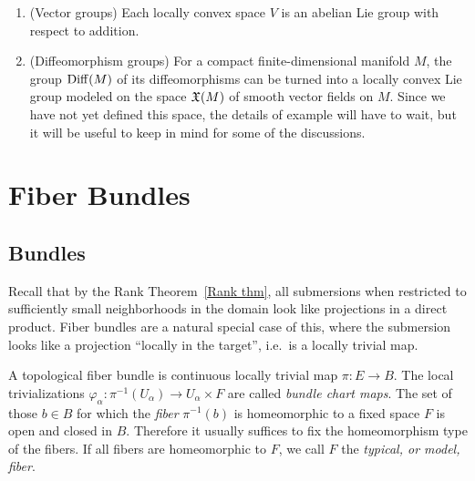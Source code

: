 \begin{example}
    \begin{enumerate}[label=(\alph*)]
        \item (Vector groups) Each locally convex space $V$ is an abelian Lie group with respect to addition.
        \item (Diffeomorphism groups) For a compact finite-dimensional manifold $M$, the group $\operatorname{Diff}(M)$ of its diffeomorphisms can be turned into a locally convex Lie group modeled on the space $\mathfrak{X}(M)$ of smooth vector fields on $M$. Since we have not yet defined this space, the details of example will have to wait, but it will be useful to keep in mind for some of the discussions.
    \end{enumerate}
\end{example}











\newpage
\section{Fiber Bundles}\label{sec: Fiber bundles}

\subsection{Bundles}

Recall that by the Rank Theorem~\ref{Rank thm}, all submersions when restricted to sufficiently small neighborhoods in the domain look like projections in a direct product. Fiber bundles are a natural special case of this, where the submersion looks like a projection ``locally in the target'', i.e.~is a locally trivial map. 

\begin{defn}
    A topological fiber bundle is continuous locally trivial map $\pi:E\to B$. The local trivializations $\varphi_\alpha:\pi^{-1}(U_\alpha)\to U_\alpha\times F$ are called \emph{bundle chart maps}. The set of those $b\in B$ for which the \emph{fiber} $\pi^{-1}(b)$ is homeomorphic to a fixed space $F$ is open and closed in $B$. Therefore it usually suffices to fix the homeomorphism type of the fibers. If all fibers are homeomorphic to $F$, we call $F$ the \emph{typical, or model, fiber}.
\end{defn}

